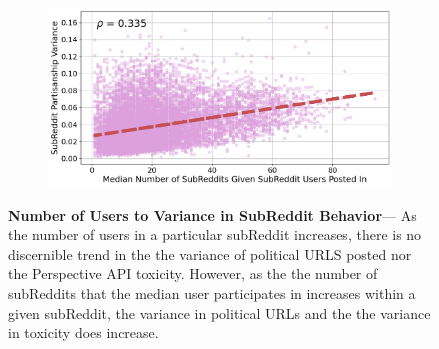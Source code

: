 \begin{figure}
\begin{subfigure}{.48\textwidth}
\label{fig:particiption-median-toxicity}
\end{subfigure}%
\begin{subfigure}{.48\textwidth}
  \centering
  \includegraphics[width=1\linewidth]{figures/toxicity-to-num-subreddits.png}

 \label{fig:cdf-user-hyperlinks}
\end{subfigure}
\label{fig:cdf-hyperlinsk}
\caption{\textbf{Number of Users to Variance in SubReddit Behavior}--- As the number of users in a particular subReddit increases, there is no discernible trend in the the variance of political URLS posted nor the Perspective API toxicity. However, as the the number of subReddits that the median user participates in increases within a given subReddit, the variance in political URLs and the the variance in toxicity does increase.  
}
\label{fig:participation}
\end{figure}

